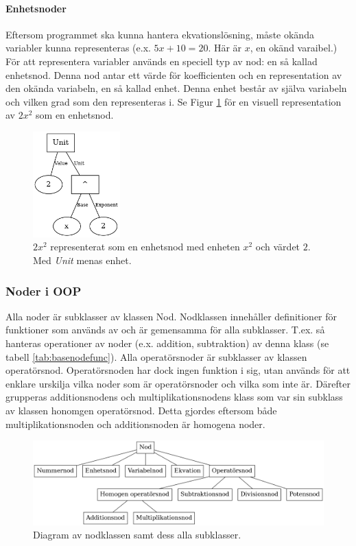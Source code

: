 \documentclass[12pt,a4paper]{article}
\begin{document}
\paragraph{Enhetsnoder}
Eftersom programmet ska kunna hantera ekvationslösning, måste okända variabler kunna representeras (e.x. \(5x + 10 = 20\). Här är \(x\), en okänd varaibel.) För att representera variabler används en speciell typ av nod: en så kallad enhetsnod. Denna nod antar ett värde för koefficienten och en representation av den okända variabeln, en så kallad enhet. Denna enhet består av själva variabeln och vilken grad som den representeras i. Se Figur \ref{fig:2132} för en visuell representation av \(2x^{2}\) som en enhetsnod.
\begin{figure}[H]
	\centering
	\includegraphics[width=0.3\textwidth]{image25}
	\caption{\(2x^{2}\) representerat som en enhetsnod med enheten \(x^{2}\) och värdet \(2\). Med \textit{Unit} menas enhet.}
	\label{fig:2132}
\end{figure}
\subsubsection{Noder i OOP}
Alla noder är subklasser av klassen Nod. Nodklassen innehåller definitioner för funktioner som används av och är gemensamma för alla subklasser. T.ex. så hanteras operationer av noder (e.x. addition, subtraktion) av denna klass (se tabell \ref{tab:basenodefunc}). Alla operatörsnoder är subklasser av klassen operatörsnod. Operatörsnoden har dock ingen funktion i sig, utan används för att enklare urskilja vilka noder som är operatörsnoder och vilka som inte är. Därefter grupperas additionsnodens och multiplikationsnodens klass som var sin subklass av klassen honomgen operatörsnod. Detta gjordes eftersom både multiplikationsnoden och additionsnoden är homogena noder.
\begin{figure}[h!]
  \center
  \includegraphics[width=1\textwidth]{image20}
  \caption{Diagram av nodklassen samt dess alla subklasser.}
\end{figure}
\end{document}
